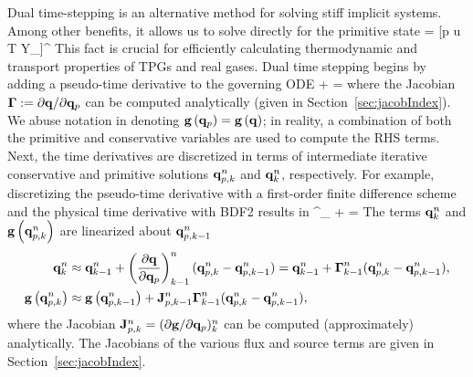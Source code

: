 Dual time-stepping is an alternative method for solving stiff implicit systems. Among other benefits, it allows us to solve directly for the primitive state
\be
    \primVec = [p \quad u \quad T \quad Y_\speciesIdx]^\top
\ee
This fact is crucial for efficiently calculating thermodynamic and transport properties of TPGs and real gases. Dual time stepping begins by adding a pseudo-time derivative to the governing ODE
\be
    \gm \pde{\primVec}{\tau} + \ode{\consVec}{\timeVar} = \rhsFunc{\primVec}
\ee
where the Jacobian $\boldsymbol{\Gamma} := \partial \mathbf{q} / \partial \mathbf{q}_p$ can be computed analytically (given in Section~\ref{sec:jacobIndex}). We abuse notation in denoting $\mathbf{g}\left(\mathbf{q}_p\right) = \mathbf{g}\left(\mathbf{q}\right)$; in reality, a combination of both the primitive and conservative variables are used to compute the RHS terms. Next, the time derivatives are discretized in terms of intermediate iterative conservative and primitive solutions $\mathbf{q}^{n}_{p,k}$ and $\mathbf{q}^{n}_{k}$, respectively. For example, discretizing the pseudo-time derivative with a first-order finite difference scheme and the physical time derivative with BDF2 results in
\be\label{eq:dualTimeExample}
    \gm^\timeIdx_{}  +  = 
\ee
The terms $\mathbf{q}^{n}_{k}$ and $\mathbf{g}\left(\mathbf{q}^{n}_{p,k}\right)$ are linearized about $\mathbf{q}^{n}_{p,k-1}$
\begin{align}
    \mathbf{q}^{n}_{k} &\approx \mathbf{q}^{n}_{k-1} +  \left(\frac{\partial \mathbf{q} }{\partial \mathbf{q}_p}\right)^{n}_{k-1} (\mathbf{q}^{n}_{p, k} - \mathbf{q}^{n}_{p,k-1}) = \mathbf{q}^{n}_{k-1} +  \boldsymbol{\Gamma}^{n}_{k-1} (\mathbf{q}^{n}_{p,k} - \mathbf{q}^{n}_{p,k-1}), \\
    \mathbf{g}\left(\mathbf{q}^{n}_{p,k}\right) &\approx \mathbf{g}\left( \mathbf{q}^{n}_{p,k-1}\right) + \mathbf{J}^{n}_{p,k-1} \boldsymbol{\Gamma}^{n}_{k-1} (\mathbf{q}^{n}_{p,k} - \mathbf{q}^{n}_{p,k-1}),
\end{align}
where the Jacobian $\mathbf{J}^{n}_{p,k} = (\partial \mathbf{g} / \partial \mathbf{q}_p)^{n}_{k}$ can be computed (approximately) analytically. The Jacobians of the various flux and source terms are given in Section~\ref{sec:jacobIndex}.

